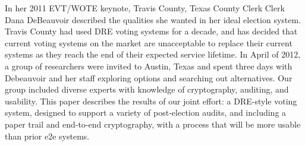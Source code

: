 In her 2011 EVT/WOTE keynote, Travis County, Texas County Clerk Clerk
Dana DeBeauvoir described the qualities she wanted in her ideal election system.
Travis County had used DRE voting systems for a decade, and has
decided that current voting systems on the market are unacceptable
to replace their current systems as they reach the end of their
expected service lifetime.
In April of 2012, a group of researchers were invited to Austin, Texas
and spent three days with Debeauvoir and her staff exploring options and
searching out alternatives.  
Our group included diverse experts with
knowledge of cryptography, auditing, and usability. This paper
describes the results of our joint effort: a DRE-style voting
system, designed to support a variety of post-election audits, and
including a paper trail and end-to-end cryptography, with a process
that will be more usable than prior e2e systems.
